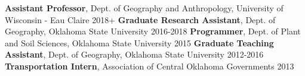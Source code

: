 \begin{cvemployment}
  \job
    {\textbf{Assistant Professor}, Dept. of Geography and Anthropology, University
      of Wisconsin - Eau Claire}
    {2018+}
  \job
    {\textbf{Graduate Research Assistant}, Dept. of Geography, Oklahoma State University}
    {2016-2018}
  \job
    {\textbf{Programmer}, Dept. of Plant and Soil Sciences, Oklahoma State University}
    {2015}
  \job
    {\textbf{Graduate Teaching Assistant}, Dept. of Geography, Oklahoma State University}
    {2012-2016}
  \job
    {\textbf{Transportation Intern}, Association of Central Oklahoma Governments}
    {2013}
\end{cvemployment}
